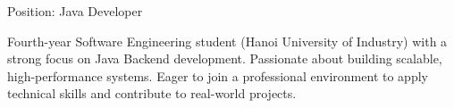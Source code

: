 \begin{cvempty} %
  \begin{cvitems} %
\item {Position: Java Developer}
\item {Fourth-year Software Engineering student (Hanoi University of Industry) with a strong focus on Java Backend development. Passionate about building scalable, high-performance systems. Eager to join a professional environment to apply technical skills and contribute to real-world projects.}
\end{cvitems}
\end{cvempty}
